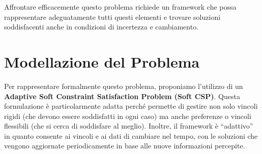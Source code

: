 \documentclass{article}
\begin{document}
Affrontare efficacemente questo problema richiede un framework che possa rappresentare adeguatamente tutti questi elementi e trovare soluzioni soddisfacenti anche in condizioni di incertezza e cambiamento.

\section{Modellazione del Problema}
Per rappresentare formalmente questo problema, proponiamo l'utilizzo di un \textbf{Adaptive Soft Constraint Satisfaction Problem (Soft CSP)}. Questa formulazione è particolarmente adatta perché permette di gestire non solo vincoli rigidi (che devono essere soddisfatti in ogni caso) ma anche preferenze o vincoli flessibili (che si cerca di soddisfare al meglio). Inoltre, il framework è ``adattivo'' in quanto consente ai vincoli e ai dati di cambiare nel tempo, con le soluzioni che vengono aggiornate periodicamente in base alle nuove informazioni percepite.
\end{document}

